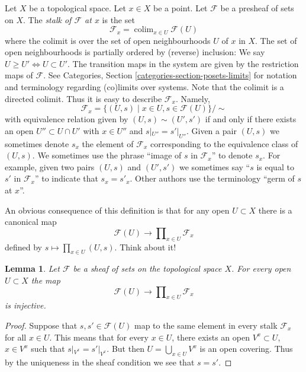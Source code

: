 \documentclass{stacks-project}
\theoremstyle{plain}
\newtheorem{lemma}[subsection]{Lemma}
\theoremstyle{definition}
\theoremstyle{remark}
\numberwithin{equation}{subsection}
\def\colim{\mathop{\mathrm{colim}}\nolimits}
\begin{document}
\noindent
Let $X$ be a topological space. Let $x \in X$ be a point.
Let $\mathcal{F}$ be a presheaf of sets on $X$.
The {\it stalk of $\mathcal{F}$ at $x$} is the set
$$
\mathcal{F}_x
=
\colim_{x\in U} \mathcal{F}(U)
$$
where the colimit is over the set of open neighbourhoods
$U$ of $x$ in $X$. The set of open neighbourhoods is
partially ordered by (reverse) inclusion:
We say $U \geq U' \Leftrightarrow U \subset U'$.
The transition maps in the system are
given by the restriction maps of $\mathcal{F}$.
See Categories, Section \ref{categories-section-posets-limits}
for notation and terminology regarding (co)limits over systems.
Note that the colimit is a directed colimit.
Thus it is easy to describe $\mathcal{F}_x$. Namely,
$$
\mathcal{F}_x
=
\{
(U, s)
\mid
x\in U, s\in \mathcal{F}(U)
\}/\sim
$$
with equivalence relation given by $(U, s) \sim (U', s')$ if and only if
there exists an open $U'' \subset U \cap U'$ with $x \in U''$ and
$s|_{U''} = s'|_{U''}$. Given a pair $(U, s)$ we sometimes denote
$s_x$ the element of $\mathcal{F}_x$ corresponding to the equivalence
class of $(U, s)$. We sometimes use the phrase
``image of $s$ in $\mathcal{F}_x$'' to denote $s_x$.
For example, given two pairs $(U, s)$ and $(U', s')$ we sometimes
say ``$s$ is equal to $s'$ in $\mathcal{F}_x$'' to indicate
that $s_x = s'_x$. Other authors use the terminology
``germ of $s$ at $x$''.

\medskip\noindent
An obvious consequence of this definition is that
for any open $U \subset X$ there is a canonical map
$$
\mathcal{F}(U)
\longrightarrow
\prod\nolimits_{x \in U} \mathcal{F}_x
$$
defined by $s \mapsto \prod_{x \in U} (U, s)$. Think about it!

\begin{lemma}
\label{lemma-sheaf-subset-stalks}
Let $\mathcal{F}$ be a sheaf of sets on the topological space $X$.
For every open $U \subset X$ the map
$$
\mathcal{F}(U)
\longrightarrow
\prod\nolimits_{x \in U} \mathcal{F}_x
$$
is injective.
\end{lemma}

\begin{proof}
Suppose that $s, s' \in \mathcal{F}(U)$ map to the same element
in every stalk $\mathcal{F}_x$ for all $x \in U$. This means that
for every $x \in U$, there exists an open $V^x \subset U$,
$x \in V^x$ such that $s|_{V^x} = s'|_{V^x}$. But then
$U = \bigcup_{x \in U} V^x$ is an open covering. Thus by the
uniqueness in the sheaf condition we see that $s = s'$.
\end{proof}
\end{document}
